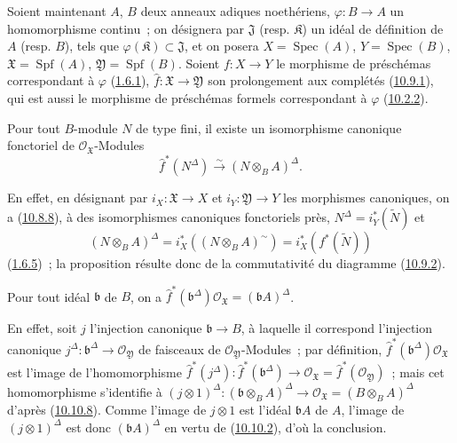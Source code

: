 \begin{env}[10.10.7]
\label{I.10.10.7-fr}
Soient maintenant $A$, $B$ deux anneaux adiques noethériens,
$\varphi:B\to A$ un homomorphisme continu~; on désignera par
$\mathfrak{J}$ (resp. $\mathfrak{K}$) un idéal de définition de $A$
(resp. $B$), tels que $\varphi(\mathfrak{K})\subset\mathfrak{J}$, et
on posera $X=\operatorname{Spec}(A)$, $Y=\operatorname{Spec}(B)$,
$\mathfrak{X}=\operatorname{Spf}(A)$,
$\mathfrak{Y}=\operatorname{Spf}(B)$. Soient $f:X\to Y$ le morphisme
de préschémas correspondant à $\varphi$
(\hyperref[I.1.6.1-fr]{1.6.1}), $\widehat f:\mathfrak{X}\to
\mathfrak{Y}$ son prolongement aux complétés
(\hyperref[I.10.9.1-fr]{10.9.1}), qui est aussi le morphisme de
préschémas formels correspondant à $\varphi$
(\hyperref[I.10.2.2-fr]{10.2.2}).
\end{env}

\begin{proposition}[10.10.8]
\label{I.10.10.8-fr}
Pour tout $B$-module $N$ de type fini, il existe un isomorphisme
canonique fonctoriel de $\mathscr{O}_{\mathfrak{X}}$-Modules
\[
  \widehat f^*(N^\Delta)
  \xrightarrow{\sim}
  (N\otimes_B A)^\Delta.
\]
\end{proposition}

En effet, en désignant par $i_X:\mathfrak{X}\to X$ et
$i_Y:\mathfrak{Y}\to Y$ les morphismes canoniques, on a
(\hyperref[I.10.8.8-fr]{10.8.8}), à des isomorphismes canoniques
fonctoriels près, $N^\Delta=i_Y^*(\widetilde N)$ et
\[
  (N\otimes_B A)^\Delta
  =i_X^*((N\otimes_B A)^{\sim})
  =i_X^*(f^*(\widetilde N))
\]
(\hyperref[I.1.6.5-fr]{1.6.5})~; la proposition résulte donc de la
commutativité du diagramme (\hyperref[I.10.9.2-fr]{10.9.2}).

\begin{corollary}[10.10.9]
\label{I.10.10.9-fr}
Pour tout idéal $\mathfrak b$ de $B$, on a
$\widehat f^*(\mathfrak b^\Delta)\mathscr{O}_{\mathfrak{X}}
=(\mathfrak bA)^\Delta$.
\end{corollary}

En effet, soit $j$ l'injection canonique $\mathfrak b\to B$, à laquelle
il correspond l'injection canonique
$j^\Delta:\mathfrak b^\Delta\to\mathscr{O}_{\mathfrak{Y}}$ de
faisceaux de $\mathscr{O}_{\mathfrak{Y}}$-Modules~; par définition,
$\widehat f^*(\mathfrak b^\Delta)\mathscr{O}_{\mathfrak{X}}$ est
l'image de l'homomorphisme
$\widehat f^*(j^\Delta):\widehat f^*(\mathfrak b^\Delta)\to
\mathscr{O}_{\mathfrak{X}}=\widehat f^*(\mathscr{O}_{\mathfrak{Y}})$~;
mais cet homomorphisme s'identifie à
$(j\otimes1)^\Delta:(\mathfrak b\otimes_B A)^\Delta\to
\mathscr{O}_{\mathfrak{X}}=(B\otimes_B A)^\Delta$ d'après
(\hyperref[I.10.10.8-fr]{10.10.8}). Comme l'image de $j\otimes1$ est
l'idéal $\mathfrak bA$ de $A$, l'image de $(j\otimes1)^\Delta$ est
donc $(\mathfrak bA)^\Delta$ en vertu de
(\hyperref[I.10.10.2-fr]{10.10.2}), d'où la conclusion.
